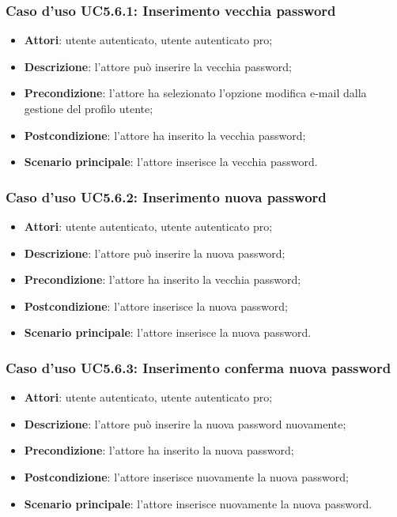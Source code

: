 \subsubsection{Caso d'uso UC5.6.1: Inserimento vecchia password}

\begin{itemize}
	\item \textbf{Attori}: utente autenticato, utente autenticato pro;
	\item \textbf{Descrizione}: l'attore può inserire la vecchia password;
	\item \textbf{Precondizione}:  l'attore ha selezionato l'opzione modifica e-mail dalla gestione del profilo utente;
	\item \textbf{Postcondizione}: l'attore ha inserito la vecchia password;
	\item \textbf{Scenario principale}: l'attore inserisce la vecchia password.
\end{itemize}

\subsubsection{Caso d'uso UC5.6.2: Inserimento nuova password}

\begin{itemize}
	\item \textbf{Attori}: utente autenticato, utente autenticato pro;
	\item \textbf{Descrizione}: l'attore può inserire la nuova password;
	\item \textbf{Precondizione}: l'attore ha inserito la vecchia password;
	\item \textbf{Postcondizione}: l'attore inserisce la nuova password;
	\item \textbf{Scenario principale}: l'attore inserisce la nuova password.
\end{itemize}

\subsubsection{Caso d'uso UC5.6.3: Inserimento conferma nuova password}

\begin{itemize}
	\item \textbf{Attori}: utente autenticato, utente autenticato pro;
	\item \textbf{Descrizione}: l'attore può inserire la nuova password nuovamente;
	\item \textbf{Precondizione}: l'attore ha inserito la nuova password;
	\item \textbf{Postcondizione}: l'attore inserisce nuovamente la nuova password;
	\item \textbf{Scenario principale}: l'attore inserisce nuovamente la nuova password.
\end{itemize}


